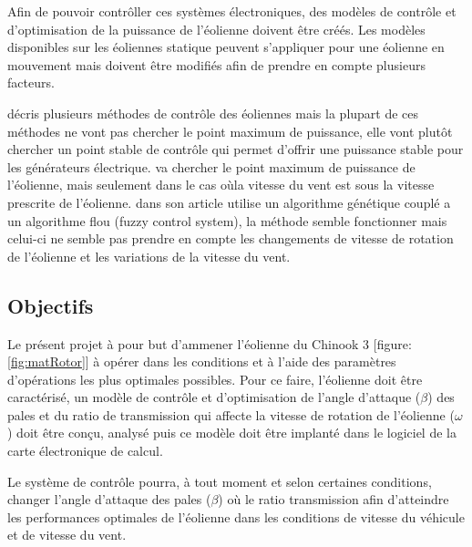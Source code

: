 Afin de pouvoir contrôller ces systèmes électroniques, des modèles de contrôle et d'optimisation de la puissance de l'éolienne doivent être créés. Les modèles disponibles sur les éoliennes statique peuvent s'appliquer pour une éolienne en mouvement mais doivent être modifiés afin de prendre en compte plusieurs facteurs.

\cite{LaksPao} décris plusieurs méthodes de contrôle des éoliennes mais la plupart de ces méthodes ne vont pas chercher le point maximum de puissance, elle vont plutôt chercher un point stable de contrôle qui permet d'offrir une puissance stable pour les générateurs électrique. \citet{Jelavic05} va chercher le point maximum de puissance de l'éolienne, mais seulement dans le cas oùla vitesse du vent est sous la vitesse prescrite de l'éolienne. \citet{Ouissam12} dans son article utilise un algorithme génétique couplé a un algorithme flou (fuzzy control system), la méthode semble fonctionner mais celui-ci ne semble pas prendre en compte les changements de vitesse de rotation de l'éolienne et les variations de la vitesse du vent.

\subsection{Objectifs} %
\label{sub:Objectifs}


Le présent projet à pour but d'ammener l'éolienne du Chinook 3 [figure: \ref{fig:matRotor}] à opérer dans les conditions et à l'aide des paramètres d'opérations les plus optimales possibles. Pour ce faire, l'éolienne doit être caractérisé, un modèle de contrôle et d'optimisation de l'angle d'attaque ($\beta$) des pales et du ratio de transmission qui affecte la vitesse de rotation de l'éolienne ($\omega$) doit être conçu, analysé puis ce modèle doit être implanté dans le logiciel de la carte électronique de calcul.

Le système de contrôle pourra, à tout moment et selon certaines conditions, changer l'angle d'attaque des pales ($\beta$) où le ratio transmission afin d'atteindre les performances optimales de l'éolienne dans les conditions de vitesse du véhicule et de vitesse du vent.

